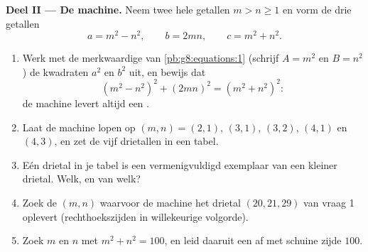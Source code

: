 \begin{problem}[{Weekendopgave --- rechthoekige driehoeken met hele getallen,
en het merkwaardige product $(m^2 - n^2)^2 + (2mn)^2 = (m^2 + n^2)^2$ dat ze
allemaal voortbrengt}]
\medskip
\noindent\textbf{Deel II --- De machine.}
Neem twee hele getallen $m > n \geq 1$ en vorm de drie getallen
\[
a = m^2 - n^2,
\qquad
b = 2mn,
\qquad
c = m^2 + n^2 .
\]
\begin{enumerate}[resume]
  \item Werk met de merkwaardige  van \cref{pb:g8:equations:1} (schrijf
        $A = m^2$ en $B = n^2$) de kwadraten $a^2$ en $b^2$ uit, en bewijs dat
        \[
        \left(m^2 - n^2\right)^2 + (2mn)^2
        = \left(m^2 + n^2\right)^2 :
        \]
        de machine levert altijd een .
  \item Laat de machine lopen op $(m, n) = (2, 1)$, $(3, 1)$, $(3, 2)$,
        $(4, 1)$ en $(4, 3)$, en zet de vijf drietallen in een tabel.
  \item Eén drietal in je tabel is een vermenigvuldigd exemplaar van een kleiner
        drietal. Welk, en van welk?
  \item Zoek de $(m, n)$ waarvoor de machine het drietal $(20, 21, 29)$ van
        vraag 1 oplevert (rechthoekszijden in willekeurige volgorde).
  \item Zoek $m$ en $n$ met $m^2 + n^2 = 100$, en leid daaruit een  af met schuine zijde $100$.
\end{enumerate}


\end{problem}
